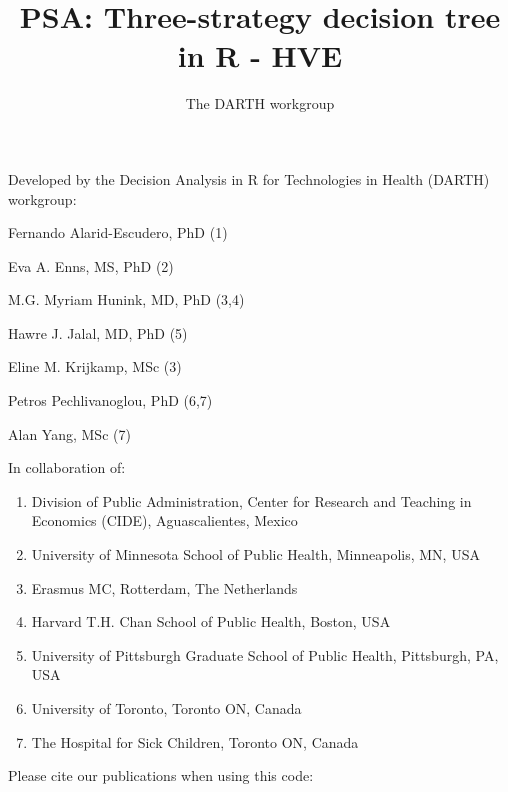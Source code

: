 \documentclass[]{article}
\title{PSA: Three-strategy decision tree in R - HVE}
\author{The DARTH workgroup}
\date{}
\providecommand{\tightlist}{%
  \setlength{\itemsep}{0pt}\setlength{\parskip}{0pt}}
\begin{document}
\maketitle

Developed by the Decision Analysis in R for Technologies in Health
(DARTH) workgroup:

Fernando Alarid-Escudero, PhD (1)

Eva A. Enns, MS, PhD (2)

M.G. Myriam Hunink, MD, PhD (3,4)

Hawre J. Jalal, MD, PhD (5)

Eline M. Krijkamp, MSc (3)

Petros Pechlivanoglou, PhD (6,7)

Alan Yang, MSc (7)

In collaboration of:

\begin{enumerate}
\def\labelenumi{\arabic{enumi}.}
\tightlist
\item
  Division of Public Administration, Center for Research and Teaching in
  Economics (CIDE), Aguascalientes, Mexico
\item
  University of Minnesota School of Public Health, Minneapolis, MN, USA
\item
  Erasmus MC, Rotterdam, The Netherlands
\item
  Harvard T.H. Chan School of Public Health, Boston, USA
\item
  University of Pittsburgh Graduate School of Public Health, Pittsburgh,
  PA, USA
\item
  University of Toronto, Toronto ON, Canada
\item
  The Hospital for Sick Children, Toronto ON, Canada
\end{enumerate}

Please cite our publications when using this code:
\end{document}

